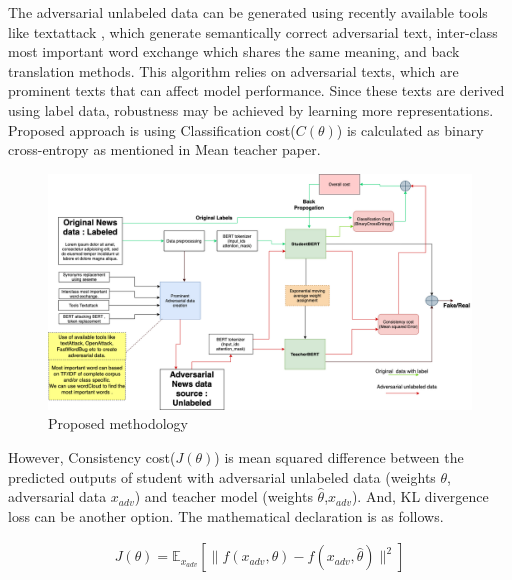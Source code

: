 \documentclass[%
	BCOR=8mm, %
	DIV=12, 
	toc=bibliography, %
	toc=listof, %
	oneside, %
	egregdoesnotlikesansseriftitles, %
	]{scrbook}
\begin{document}
The adversarial unlabeled data can be generated using recently available tools like textattack \cite{morris_textattack_2020}, which generate semantically correct adversarial text, inter-class
 most important word exchange which shares the same meaning, and back translation methods. This algorithm relies on adversarial texts, which are prominent texts that can  affect model 
 performance. Since these texts are derived using label data,  robustness may be achieved by learning more representations.\\
Proposed approach is using Classification cost($C(\theta)$) is calculated as binary cross-entropy as mentioned in Mean teacher paper. 

\begin{figure}[h!]
\centering
\includegraphics[width=1.1\textwidth]{img/Methodology.png}
\caption{Proposed methodology }
\label{diag:advMTBERT}
\end{figure}

However, Consistency cost($J(\theta)$) is mean squared difference between the predicted outputs of student with adversarial unlabeled data (weights $\theta$, adversarial data $x_{adv}$) 
and teacher model (weights $\hat\theta$,$x_{adv}$). And, KL divergence loss can be another option. The mathematical declaration is as follows. 

\begin{equation}
\begin{aligned}
J( \theta )=\mathbb{E}_{x_{adv}}[\|f(x_{adv},\theta)-f(x_{adv},\hat\theta)\|^2] 
\label{eq:ADVconsistencycost}
\end{aligned}
\end{equation}
\end{document}
